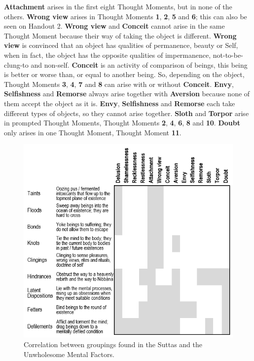 \textbf{Attachment} arises in the first eight Thought Moments, but in none of the others. \textbf{Wrong view} arises in Thought Moments \textbf{1}, \textbf{2}, \textbf{5} and \textbf{6}; this can also be seen on Handout 2. \textbf{Wrong view} and \textbf{Conceit} cannot arise in the same Thought Moment because their way of taking the object is different. \textbf{Wrong view} is convinced that an object has qualities of permanence, beauty or Self, when in fact, the object has the opposite qualities of impermanence, not-to-be-clung-to and non-self. \textbf{Conceit} is an activity of comparison of beings, this being is better or worse than, or equal to another being. So, depending on the object, Thought Moments \textbf{3}, \textbf{4}, \textbf{7} and \textbf{8} can arise with or without \textbf{Conceit}. \textbf{Envy}, \textbf{Selfishness} and \textbf{Remorse} always arise together with \textbf{Aversion} because none of them accept the object as it is. \textbf{Envy}, \textbf{Selfishness} and \textbf{Remorse} each take different types of objects, so they cannot arise together. \textbf{Sloth} and \textbf{Torpor} arise in prompted Thought Moments, Thought Moments \textbf{2}, \textbf{4}, \textbf{6}, \textbf{8} and \textbf{10}. \textbf{Doubt} only arises in one Thought Moment, Thought Moment \textbf{11}.

\pagebreak

\begin{figure}[h]
\centering
\includegraphics[width=0.75\linewidth]{./Diagrams/Groups1}
\caption{Correlation between groupings found in the Suttas and the Unwholesome Mental Factors.}
\label{fig:Groups1}
\end{figure}

